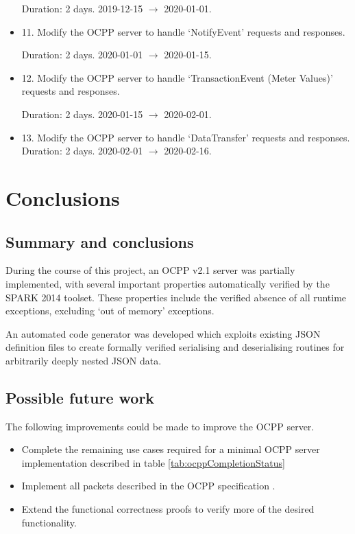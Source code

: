 \documentclass[12pt,openany,a4paper]{book}
\begin{document}
\begin{itemize}
	Duration: 2 days. 2019-12-15 $\rightarrow$ 2020-01-01.
	
	\item 11. Modify the OCPP server to handle `NotifyEvent' requests and responses.
	
	Duration: 2 days. 2020-01-01 $\rightarrow$ 2020-01-15.
	
	\item 12. Modify the OCPP server to handle `TransactionEvent (Meter Values)' requests and responses.
	
	Duration: 2 days. 2020-01-15 $\rightarrow$ 2020-02-01.
	
	\item 13. Modify the OCPP server to handle `DataTransfer' requests and responses.
	Duration: 2 days. 2020-02-01 $\rightarrow$ 2020-02-16.
	
\end{itemize}
	

\chapter{Conclusions}
\section{Summary and conclusions}

During the course of this project, an OCPP v2.1 server was partially implemented, with several important properties automatically verified by the SPARK 2014 toolset. These properties include the verified absence of all runtime exceptions, excluding `out of memory' exceptions. 

An automated code generator was developed which exploits existing JSON definition files to create formally verified serialising and deserialising routines for arbitrarily deeply nested JSON data.


\section{Possible future work}
The following improvements could be made to improve the OCPP server.
\begin {itemize}
	\item Complete the remaining use cases required for a minimal OCPP server implementation described in table \ref{tab:ocppCompletionStatus}
	\item Implement all packets described in the OCPP specification \cite{ocpp}.
	\item Extend the functional correctness proofs to verify more of the desired functionality.
\end{itemize}
\end{document}
